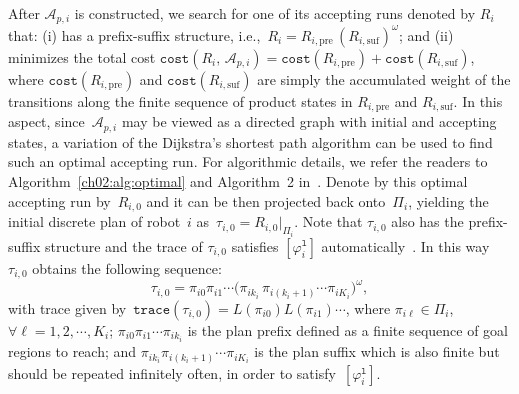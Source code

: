 After ${\mathcal{A}}_{p,i}$ is constructed, we search for one of its accepting runs denoted by $R_i$ that: (i) has a prefix-suffix structure, i.e.,~$R_i=R_{i,\text{pre}}\,(R_{i,\text{suf}})^\omega$; and (ii) minimizes the total cost $\texttt{cost}(R_i,\, {\mathcal{A}}_{p,i})=\texttt{cost}(R_{i,\text{pre}})+\texttt{cost}(R_{i,\text{suf}})$, where $\texttt{cost}(R_{i,\text{pre}})$ and $\texttt{cost}(R_{i,\text{suf}})$ are simply the accumulated weight of the transitions along the finite sequence of product states in $R_{i,\text{pre}}$ and $R_{i,\text{suf}}$.
In this aspect, since~${\mathcal{A}}_{p,i}$ may be viewed as a directed graph with initial and accepting states, a variation of the Dijkstra's shortest path algorithm can be used to find such an optimal accepting run.
For algorithmic details, we refer the readers to Algorithm~\ref{ch02:alg:optimal} and Algorithm~2 in~\cite{guo2012infeasible}.
Denote by this optimal accepting run by~$R_{i,0}$ and it can be then projected back onto~$\Pi_i$, yielding the initial discrete plan of robot~$i$ as~$\tau_{i,0}=R_{i,0}|_{\Pi_i}$.
Note that $\tau_{i,0}$ also has the prefix-suffix structure and the trace of $\tau_{i,0}$ satisfies $[\varphi_{i}^\texttt{l}]$ automatically~\cite{baier2008principles}.
In this way $\tau_{i,0}$ obtains the following sequence:
\begin{equation}\label{ch03:eq:plan}
\tau_{i,0} = \pi_{i0}\pi_{i1}\cdots \big(\pi_{ik_i}\,\pi_{i(k_i+1)}\cdots \pi_{iK_i}\big)^{\omega},
\end{equation}
with trace given by~$\texttt{trace}(\tau_{i,0})=L(\pi_{i0})L(\pi_{i1})\cdots$, where $\pi_{i\ell}\in \Pi_i$, $\forall \ell=1,2,\cdots,K_i$;
$\pi_{i0}\pi_{i1}\cdots \pi_{ik_i}$ is the plan prefix defined as a finite sequence of goal regions to reach; and $\pi_{ik_i}\pi_{i(k_i+1)}\cdots \pi_{iK_i}$ is the plan suffix which is also finite but should be repeated infinitely often, in order to satisfy~$[\varphi_{i}^\texttt{l}]$.

